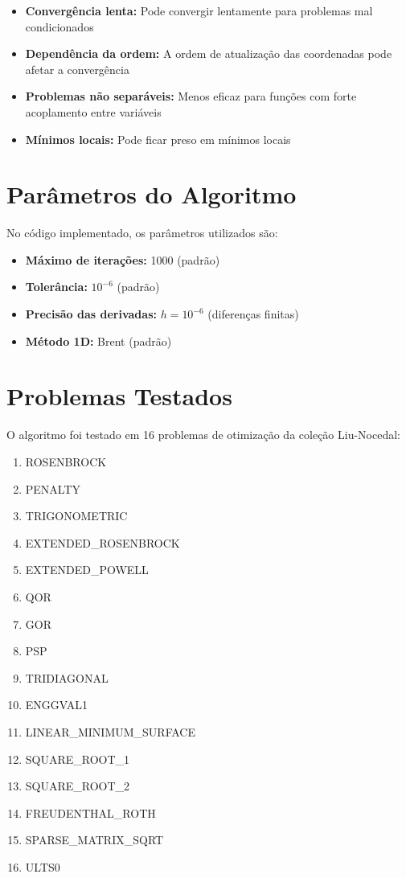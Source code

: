 \documentclass[12pt]{article}
\begin{document}
\begin{itemize}
    \item \textbf{Convergência lenta:} Pode convergir lentamente para problemas mal condicionados
    \item \textbf{Dependência da ordem:} A ordem de atualização das coordenadas pode afetar a convergência
    \item \textbf{Problemas não separáveis:} Menos eficaz para funções com forte acoplamento entre variáveis
    \item \textbf{Mínimos locais:} Pode ficar preso em mínimos locais
\end{itemize}

\section{Parâmetros do Algoritmo}

No código implementado, os parâmetros utilizados são:

\begin{itemize}
    \item \textbf{Máximo de iterações:} 1000 (padrão)
    \item \textbf{Tolerância:} $10^{-6}$ (padrão)
    \item \textbf{Precisão das derivadas:} $h = 10^{-6}$ (diferenças finitas)
    \item \textbf{Método 1D:} Brent (padrão)
\end{itemize}

\section{Problemas Testados}

O algoritmo foi testado em 16 problemas de otimização da coleção Liu-Nocedal:

\begin{enumerate}
    \item ROSENBROCK
    \item PENALTY
    \item TRIGONOMETRIC
    \item EXTENDED\_ROSENBROCK
    \item EXTENDED\_POWELL
    \item QOR
    \item GOR
    \item PSP
    \item TRIDIAGONAL
    \item ENGGVAL1
    \item LINEAR\_MINIMUM\_SURFACE
    \item SQUARE\_ROOT\_1
    \item SQUARE\_ROOT\_2
    \item FREUDENTHAL\_ROTH
    \item SPARSE\_MATRIX\_SQRT
    \item ULTS0
\end{enumerate}
\end{document}
